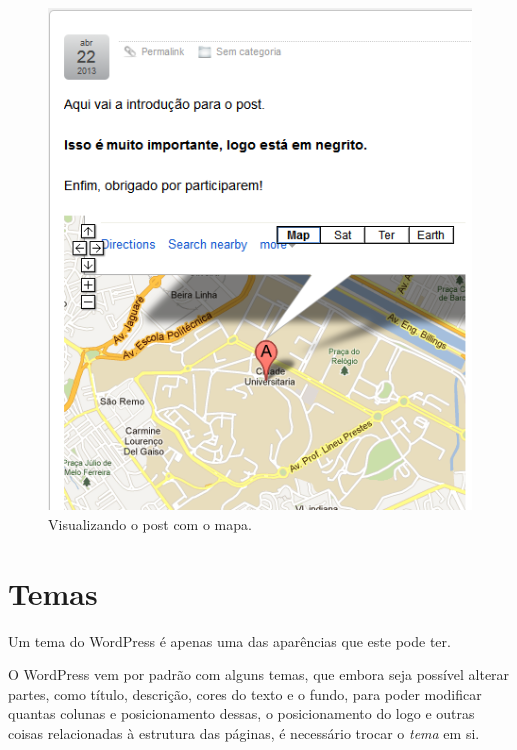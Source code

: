 \documentclass[12pt,onecolumn]{article}
\begin{document}
\begin{enumerate}
\begin{figure}[H]
						\includegraphics{html5.png}
						\caption{Visualizando o post com o mapa.}
					\end{figure}
			\end{enumerate}

\clearpage
\section{Temas}
	Um tema do WordPress é apenas uma das aparências que este pode ter. 

	O WordPress vem por padrão com alguns temas, que embora seja possível alterar partes, 
	como título, descrição, cores do texto e o fundo, para poder modificar quantas colunas
	e posicionamento dessas, o posicionamento do logo e outras coisas relacionadas à estrutura 
	das páginas, é necessário trocar o \textit{tema} em si.
	
    
	
\end{document}

